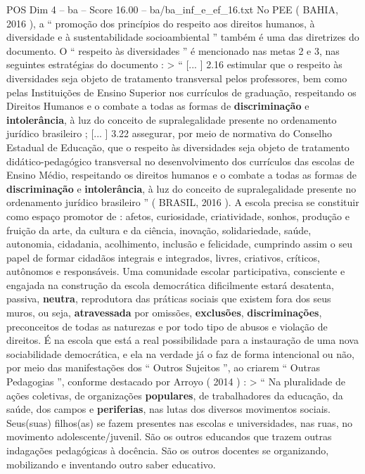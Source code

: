 \begin{textsample}{POS Dim 4 – ba – Score 16.00 – ba/ba\_inf\_e\_ef\_16.txt}
No PEE ( BAHIA, 2016 ), a “ promoção dos princípios do respeito aos direitos humanos, à diversidade e à sustentabilidade socioambiental ” também é uma das diretrizes do documento.
O “ respeito às diversidades ” é mencionado nas metas 2 e 3, nas seguintes estratégias do documento : > “ [... ] 2.16 estimular que o respeito às diversidades seja objeto de tratamento transversal pelos professores, bem como pelas Instituições de Ensino Superior nos currículos de graduação, respeitando os Direitos Humanos e o combate a todas as formas de \textbf{discriminação} e \textbf{intolerância}, à luz do conceito de supralegalidade presente no ordenamento jurídico brasileiro ; [... ] 3.22 assegurar, por meio de normativa do Conselho Estadual de Educação, que o respeito às diversidades seja objeto de tratamento didático-pedagógico transversal no desenvolvimento dos currículos das escolas de Ensino Médio, respeitando os direitos humanos e o combate a todas as formas de \textbf{discriminação} e \textbf{intolerância}, à luz do conceito de supralegalidade presente no ordenamento jurídico brasileiro ” ( BRASIL, 2016 ).
A escola precisa se constituir como espaço promotor de : afetos, curiosidade, criatividade, sonhos, produção e fruição da arte, da cultura e da ciência, inovação, solidariedade, saúde, autonomia, cidadania, acolhimento, inclusão e felicidade, cumprindo assim o seu papel de formar cidadãos integrais e integrados, livres, criativos, críticos, autônomos e responsáveis.
Uma comunidade escolar participativa, consciente e engajada na construção da escola democrática dificilmente estará desatenta, passiva, \textbf{neutra}, reprodutora das práticas sociais que existem fora dos seus muros, ou seja, \textbf{atravessada} por omissões, \textbf{exclusões}, \textbf{discriminações}, preconceitos de todas as naturezas e por todo tipo de abusos e violação de direitos.
É na escola que está a real possibilidade para a instauração de uma nova sociabilidade democrática, e ela na verdade já o faz de forma intencional ou não, por meio das manifestações dos “ Outros Sujeitos ”, ao criarem “ Outras Pedagogias ”, conforme destacado por Arroyo ( 2014 ) : > “ Na pluralidade de ações coletivas, de organizações \textbf{populares}, de trabalhadores da educação, da saúde, dos campos e \textbf{periferias}, nas lutas dos diversos movimentos sociais.
Seus(suas) filhos(as) se fazem presentes nas escolas e universidades, nas ruas, no movimento adolescente/juvenil.
São os outros educandos que trazem outras indagações pedagógicas à docência.
São os outros docentes se organizando, mobilizando e inventando outro saber educativo.

\end{textsample}
